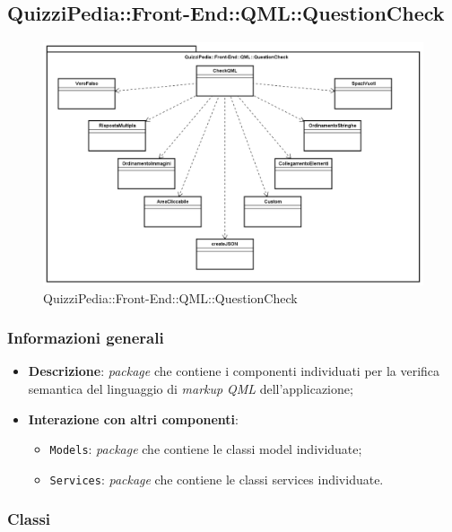 \newpage
\subsection{QuizziPedia::Front-End::QML::QuestionCheck}


\begin{figure} [ht]
	\centering
	\includegraphics[scale=0.42]{UML/Package/QuizziPedia_Front-End_QML_QuestionCheck.png}
	\caption{QuizziPedia::Front-End::QML::QuestionCheck}
\end{figure} \FloatBarrier

\subsubsection{Informazioni generali}
\begin{itemize}
	\item \textbf{Descrizione}: \textit{package} che contiene i componenti individuati per la verifica semantica del linguaggio di \textit{markup} \textit{QML} dell'applicazione;
	\item \textbf{Interazione con altri componenti}:
	\begin{itemize}
		\item \texttt{Models}: \textit{package} che contiene le classi model individuate;
		\item \texttt{Services}: \textit{package} che contiene le classi services individuate.
	\end{itemize} 
\end{itemize}
\subsubsection{Classi}











